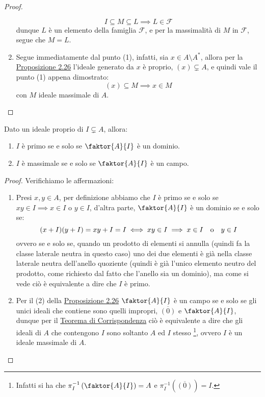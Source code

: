 \documentclass[11pt]{scrartcl}
\begin{document}
\begin{proof}
\begin{enumerate}
                \[ I \subseteq M \subseteq L \implies L \in \mathcal{F}
                    \]
            dunque $L$ è un elemento della famiglia $\mathcal{F}$, e per la massimalità di $M$ in $\mathcal{F}$, segue che $M = L$.
        \item Segue immediatamente dal punto (1), infatti, sia $x \in A \setminus A^*$, allora per la \hyperref[2.26]{Proposizione 2.26} l'ideale generato da $x$ è proprio,
        $(x) \subsetneq A$, e quindi vale il punto (1) appena dimostrato:
            \[ (x) \subseteq M \implies x \in M
                \]
        con $M$ ideale massimale di $A$.
    \end{enumerate}
\end{proof}

\begin{proposition}
    \label{2.56}
    Dato un ideale proprio di $I \subsetneq A$, allora:
    \begin{enumerate}[(1)]
        \item $I$ è primo se e solo se $\faktor{A}{I}$ è un dominio.
        \item $I$ è massimale se e solo se $\faktor{A}{I}$ è un campo.
    \end{enumerate}
\end{proposition}

\begin{proof}
    Verifichiamo le affermazioni:
    \begin{enumerate}[(1)]
        \item Presi $x,y \in A$, per definizione abbiamo che $I$ è primo se e solo se $xy \in I \implies x \in I$ o $y \in I$, d'altra parte, $\faktor{A}{I}$ è un dominio se e solo se:
            \[ (x+I)(y+I) = xy + I = I \iff xy \in I \implies x \in I \quad\text o\quad y \in I
                \]
            ovvero se e solo se, quando un prodotto di elementi si annulla (quindi fa la classe laterale neutra in questo caso) uno dei due elementi è già nella classe laterale neutra 
            dell'anello quoziente (quindi è già l'unico elemento neutro del prodotto, come richiesto dal fatto che l'anello sia un dominio), ma come si vede ciò è equivalente a dire che $I$ è primo.
        \item Per il (2) della \hyperref[2.26]{Proposizione 2.26} $\faktor{A}{I}$ è un campo se e solo se gli unici ideali che contiene sono quelli impropri, $\overline{(0)}$ e $\faktor{A}{I}$, dunque per il 
        \hyperref[corrispondenza]{Teorema di Corrispondenza} ciò è equivalente a dire che gli ideali di $A$ che contengono $I$ sono soltanto $A$ ed $I$ stesso \footnote{Infatti si ha che
        $\pi_I^{-1}\left(\faktor{A}{I}\right) = A$ e $\pi_I^{-1}(\overline{(0)}) = I$.}, ovvero $I$ è un ideale massimale di $A$.
    \end{enumerate}
\end{proof}
\end{document}
